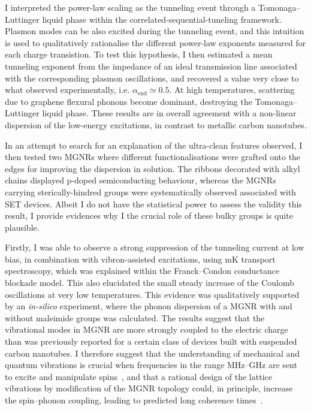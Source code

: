 I interpreted the power-law scaling as the tunneling event through a Tomonaga--Luttinger liquid phase within the correlated-sequential-tuneling framework. Plasmon modes can be also excited during the tunneling event, and this intuition is used to qualitatively rationalise the different power-law exponents measured for each charge transistion. To test this hypothesis, I then estimated a mean tunneling exponent from the impedance of an ideal transmission line associated with the corresponding plasmon oscillations, and recovered a value very close to what observed experimentally, i.e. $\alpha_\textrm{end}\simeq 0.5$. At high temperatures, scattering due to graphene flexural phonons become dominant, destroying the Tomonaga--Luttinger liquid phase. These results are in overall agreement with a non-linear dispersion of the low-energy excitations, in contrast to metallic carbon nanotubes.

In an attempt to search for an explanation of the ultra-clean features observed, I then tested two \glspl{MGNR} where different functionalisations were grafted onto the edges for improving the dispersion in solution. The ribbons decorated with alkyl chains displayed p-doped semiconducting behaviour, whereas the \glspl{MGNR} carrying sterically-hindred groups were systematically observed associated with \gls{SET} devices. Albeit I do not have the statistical power to assess the validity this result, I provide evidences why I the crucial role of these bulky groups is quite plausible.

Firstly, I was able to observe a strong suppression of the tunneling current at low bias, in combination with vibron-assisted excitations, using \si{\milli\kelvin} transport spectroscopy, which was explained within the Franck--Condon conductance blockade model. This also elucidated the small steady increase of the Coulomb oscillations at very low temperatures. This evidence was qualitatively supported by an \textit{in-silico} experiment, where the phonon dispersion of a \gls{MGNR} with and without maleimide groups was calculated. The results suggest that the vibrational modes in \gls{MGNR} are more strongly coupled to the electric charge than was previously reported for a certain class of devices built with  suspended carbon nanotubes. I therefore suggest that the understanding of mechanical and quantum vibrations is crucial when frequencies in the range \si{\mega\hertz}--\si{\giga\hertz} are sent to excite and manipulate spins~\cite{vincent2012electronic, gaita2019molecular, escalera2018spin}, and that a rational design of the lattice vibrations by modification of the \gls{MGNR} topology could, in principle, increase the spin--phonon coupling, leading to predicted long coherence times~\cite{palyi2012spin}.

